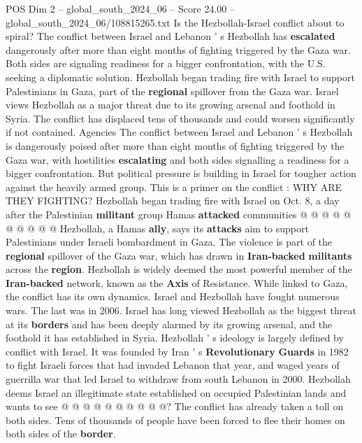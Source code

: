 \begin{textsample}{POS Dim 2 – global\_south\_2024\_06 – Score 24.00 – global\_south\_2024\_06/108815265.txt}  \label{ex:f2_pos_114}
Is the Hezbollah-Israel conflict about to spiral?
The conflict between Israel and Lebanon ' s Hezbollah has \textbf{escalated} dangerously after more than eight months of fighting triggered by the Gaza war.
Both sides are signaling readiness for a bigger confrontation, with the U.S. seeking a diplomatic solution.
Hezbollah began trading fire with Israel to support Palestinians in Gaza, part of the \textbf{regional} spillover from the Gaza war.
Israel views Hezbollah as a major threat due to its growing arsenal and foothold in Syria.
The conflict has displaced tens of thousands and could worsen significantly if not contained.
Agencies The conflict between Israel and Lebanon ' s Hezbollah is dangerously poised after more than eight months of fighting triggered by the Gaza war, with hostilities \textbf{escalating} and both sides signalling a readiness for a bigger confrontation.
But political pressure is building in Israel for tougher action against the heavily armed group.
This is a primer on the conflict : WHY ARE THEY FIGHTING?
Hezbollah began trading fire with Israel on Oct. 8, a day after the Palestinian \textbf{militant} group Hamas \textbf{attacked} communities @ @ @ @ @ @ @ @ @ @ Hezbollah, a Hamas \textbf{ally}, says its \textbf{attacks} aim to support Palestinians under Israeli bombardment in Gaza.
The violence is part of the \textbf{regional} spillover of the Gaza war, which has drawn in \textbf{Iran-backed} \textbf{militants} across the \textbf{region}.
Hezbollah is widely deemed the most powerful member of the \textbf{Iran-backed} network, known as the \textbf{Axis} of Resistance.
While linked to Gaza, the conflict has its own dynamics.
Israel and Hezbollah have fought numerous wars.
The last was in 2006.
Israel has long viewed Hezbollah as the biggest threat at its \textbf{borders} and has been deeply alarmed by its growing arsenal, and the foothold it has established in Syria.
Hezbollah ' s ideology is largely defined by conflict with Israel.
It was founded by Iran ' s \textbf{Revolutionary} \textbf{Guards} in 1982 to fight Israeli forces that had invaded Lebanon that year, and waged years of guerrilla war that led Israel to withdraw from south Lebanon in 2000.
Hezbollah deems Israel an illegitimate state established on occupied Palestinian lands and wants to see @ @ @ @ @ @ @ @ @ @?
The conflict has already taken a toll on both sides.
Tens of thousands of people have been forced to flee their homes on both sides of the \textbf{border}.

\end{textsample}
